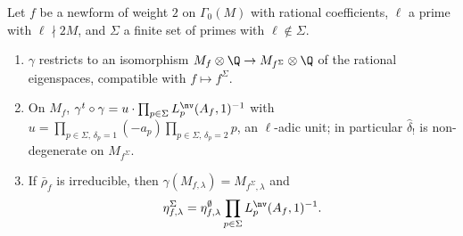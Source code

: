 \begin{theorem}\label{thm:congruence:dfg14}
Let $f$ be a newform of weight $2$ on $\Gamma_0(M)$ with rational coefficients, $\ell$ a prime with $\ell\nmid2M$, and $\Sigma$ a finite set of primes with $\ell\notin\Sigma$.
\begin{enumerate}[label=(\alph*)]
\item $\gamma$ restricts to an isomorphism $M_f\otimes\Q\to M_{f^\Sigma}\otimes\Q$ of the rational eigenspaces, compatible with $f\mapsto f^\Sigma$.
\item On $M_f$, $\gamma^t\circ\gamma=u\cdot\prod_{p\in\Sigma}L^{\nv}_p(A_f,1)^{-1}$ with $u=\prod_{p\in\Sigma,\,\delta_p=1}(-a_p)\prod_{p\in\Sigma,\,\delta_p=2}p$, an $\ell$-adic unit; in particular $\hat\delta_!$ is non-degenerate on
$M_{f^\Sigma}$.
\item If $\bar\rho_f$ is irreducible, then $\gamma(M_{f,\lambda})=M_{f^\Sigma,\lambda}$ and
\[
\eta^\Sigma_{f,\lambda}=\eta^\emptyset_{f,\lambda}\prod_{p\in\Sigma}L^{\nv}_p(A_f,1)^{-1}.
\]
\end{enumerate}
\end{theorem}

